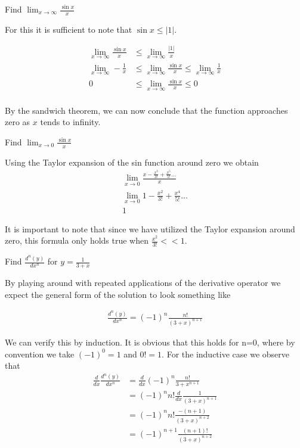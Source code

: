 \documentclass[a4paper]{article}
\begin{document}
\begin{question}
	Find \(\lim_{x \to \infty} \frac{\sin x}{x}\)
\end{question}

For this it is sufficient to note that \(\sin x \leq |1|\).

\begin{align*}
	\lim_{x \to \infty} \frac{\sin x}{x} &\leq \lim_{x \to \infty} \frac{|1|}{x} \\
	\lim_{x \to \infty} -\frac{1}{x} &\leq \lim_{x \to \infty} \frac{\sin x}{x} \leq \lim_{x \to \infty} \frac{1}{x} \\
	0 &\leq \lim_{x \to \infty} \frac{\sin x}{x} \leq 0 \\
\end{align*}

By the sandwich theorem, we can now conclude that the function approaches zero as \(x\) tends to infinity.

\begin{question}
	Find \(\lim_{x \to 0} \frac{\sin x}{x}\)
\end{question}
Using the Taylor expansion of the sin function around zero we obtain
\begin{align*}
	\lim_{x \to 0} \frac{x - \frac{x^3}{3!} + \frac{x^5}{5!}...}{x} \\
	\lim_{x \to 0} 1 - \frac{x^2}{3!} + \frac{x^4}{5!}... \\
	1
\end{align*}

It is important to note that since we have utilized the Taylor expansion around zero, this formula only holds true when \(\frac{x^2}{3!} << 1\).

\begin{question}
	Find \(\frac{d^n(y)}{dx^n}\) for \(y = \frac{1}{3+x}\)
\end{question}

By playing around with repeated applications of the derivative operator we expect the general form of the solution to look something like

\begin{align*}
	\frac{d^n(y)}{dx^n} = (-1)^n \frac{n!}{(3+x)^{n+1}} 
\end{align*}

We can verify this by induction. It is obvious that this holds for n=0, where by convention we take \((-1)^0 = 1\) and \(0! = 1\). For the inductive case we observe that
\begin{align*}
	\frac{d}{dx} \frac{d^n(y)}{dx^n} &= \frac{d}{dx} (-1)^n \frac{n!}{3+x^{n+1}} \\
	&= (-1)^n n! \frac{d}{dx} \frac{1}{(3+x)^{n+1}} \\
	&= (-1)^n n! \frac{-(n+1)}{(3+x)^{n+2}} \\
	&= (-1)^{n+1} \frac{(n+1)!}{(3+x)^{n+2}}
\end{align*} 
\end{document}
